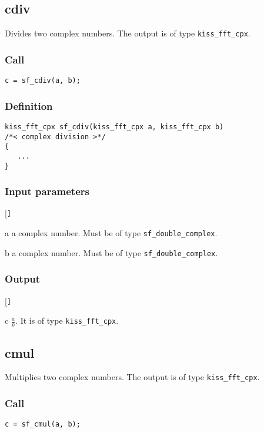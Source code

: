 \subsection{{cdiv}}
Divides two complex numbers. The output is of type \texttt{kiss\_fft\_cpx}.

\subsubsection*{Call}
\begin{verbatim}c = sf_cdiv(a, b);\end{verbatim}

\subsubsection*{Definition}
\begin{verbatim}
kiss_fft_cpx sf_cdiv(kiss_fft_cpx a, kiss_fft_cpx b)
/*< complex division >*/
{
   ...
}
\end{verbatim}

\subsubsection*{Input parameters}
\begin{desclist}{\tt }{\quad}[\tt ]
   \setlength\itemsep{0pt}
   \item[a] a complex number. Must be of type \texttt{sf\_double\_complex}.  
   \item[b] a complex number. Must be of type \texttt{sf\_double\_complex}.  
\end{desclist}

\subsubsection*{Output}
\begin{desclist}{\tt }{\quad}[\tt ]
   \setlength\itemsep{0pt}
   \item[c] $\frac{a}{b}$. It is of type \texttt{kiss\_fft\_cpx}.
\end{desclist}




\subsection{{cmul}}
Multiplies two complex numbers. The output is of type \texttt{kiss\_fft\_cpx}.

\subsubsection*{Call}
\begin{verbatim}c = sf_cmul(a, b);\end{verbatim}

